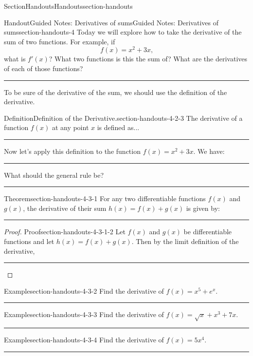 \documentclass[twoside,10pt,]{article}
\newlength{\workspacestrutwidth}
\numberwithin{equation}{section}
\begin{document}
\begin{sectionptx}{Section}{Handouts}{}{Handouts}{}{}{section-handouts}
\begin{handout-subsection}{Handout}{Guided Notes: Derivatives of sums}{}{Guided Notes: Derivatives of sums}{}{}{section-handouts-4}
Today we will explore how to take the derivative of the sum of two functions.  For example, if%
\begin{equation*}
f(x) = x^2 + 3x\text{,}
\end{equation*}
what is \(f'(x)\)?  What two functions is this the sum of?  What are the derivatives of each of those functions?%
\par\rule{\workspacestrutwidth}{1in}%
\par
To be sure of the derivative of the sum, we should use the definition of the derivative.%
\begin{definition}{Definition}{Definition of the Derivative.}{section-handouts-4-2-3}%
The derivative of a function \(f(x)\) at any point \(x\) is defined as...%
\par\rule{\workspacestrutwidth}{.75in}%
\end{definition}
Now let's apply this definition to the function \(f(x) = x^2 + 3x\). We have:%
\par\rule{\workspacestrutwidth}{2in}%
\par
What should the general rule be?%
\par\rule{\workspacestrutwidth}{0.25in}%
\clearpage
\begin{theorem}{Theorem}{}{}{section-handouts-4-3-1}%
For any two differentiable functions \(f(x)\) and \(g(x)\), the derivative of their sum \(h(x) = f(x) + g(x)\) is given by:%
\par\rule{\workspacestrutwidth}{0.5in}%
\end{theorem}
\begin{proof}{Proof}{}{section-handouts-4-3-1-2}
Let \(f(x)\) and \(g(x)\) be differentiable functions and let \(h(x) = f(x) + g(x)\).  Then by the limit definition of the derivative,%
\par\rule{\workspacestrutwidth}{3in}%
\end{proof}
\begin{example}{Example}{}{section-handouts-4-3-2}%
Find the derivative of \(f(x) = x^5 + e^x\).%
\par\rule{\workspacestrutwidth}{1in}%
\end{example}
\begin{example}{Example}{}{section-handouts-4-3-3}%
Find the derivative of \(f(x) = \sqrt{x} + x^3 + 7x\).%
\par\rule{\workspacestrutwidth}{1in}%
\end{example}
\begin{example}{Example}{}{section-handouts-4-3-4}%
Find the derivative of \(f(x) = 5x^4\).%
\par\rule{\workspacestrutwidth}{1in}%
\end{example}
\end{handout-subsection}
\restoregeometry
\end{sectionptx}
\end{document}
